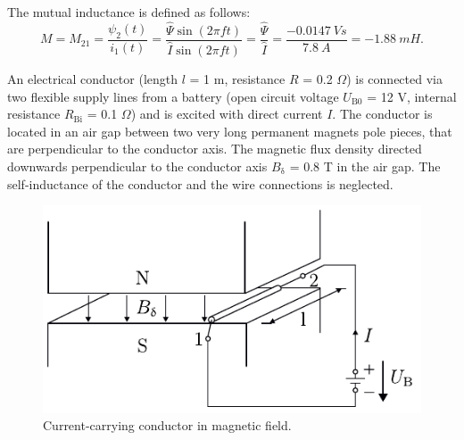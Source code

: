 
\begin{solutionblock}
   The mutual inductance is defined as follows:
    \begin{equation}
        M = M_{\mathrm{21}} = \frac{\psi_{\mathrm{2}}(t)}{i_{\mathrm{1}}(t)}
        = \frac{\mathit{\hat{\Psi}} \sin(2 \pi f t)}{\hat{I} \sin(2 \pi f t)}
        = \frac{\mathit{\hat{\Psi}}}{\hat{I}}
        = \frac{-0.0147 \ \si{Vs}}{7.8 \ \si{A}}
        = -1.88 \ \si{mH}.
    \end{equation}

\end{solutionblock}







An electrical conductor (length $l$ = 1 m, resistance $R$ = 0.2 $\Omega$) is connected via two flexible supply lines from a battery (open circuit voltage $U_{\mathrm{B0}}$ = 12 V, internal resistance $R_{\mathrm{Bi}}$ = 0.1 $\Omega$) and is excited with direct current $I$. The conductor is located in an air gap between two very long permanent magnets pole pieces, that are perpendicular to the conductor axis.
The magnetic flux density directed downwards perpendicular to the conductor axis $B_{\mathrm{\updelta}}$ = 0.8 T in the air gap. The self-inductance of the conductor and the wire connections is neglected.

\begin{figure}[htb]
    \centering
    \includegraphics{fig/ex01/ConductorInMagneticField.pdf}
    \caption{Current-carrying conductor in magnetic field.}
    \label{fig:ConductorInMagneticField}
\end{figure}


